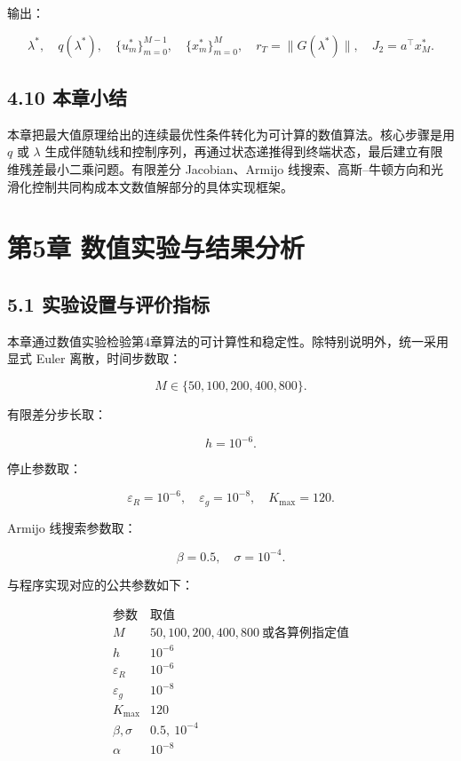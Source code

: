 \documentclass[UTF8,a4paper,zihao=-4]{ctexart}
\begin{document}
输出：

\[
\lambda^*,\quad q(\lambda^*),\quad \{u_m^*\}_{m=0}^{M-1},\quad
\{x_m^*\}_{m=0}^{M},\quad r_T=\|G(\lambda^*)\|,\quad J_2=a^\top x_M^*.
\]

\subsection{4.10 本章小结}

本章把最大值原理给出的连续最优性条件转化为可计算的数值算法。核心步骤是用 $q$ 或 $\lambda$ 生成伴随轨线和控制序列，再通过状态递推得到终端状态，最后建立有限维残差最小二乘问题。有限差分 Jacobian、Armijo 线搜索、高斯--牛顿方向和光滑化控制共同构成本文数值解部分的具体实现框架。

\section{第5章 数值实验与结果分析}

\subsection{5.1 实验设置与评价指标}

本章通过数值实验检验第4章算法的可计算性和稳定性\cite[第180--190页]{kiselev2007}\cite[第10--31页]{avvakumov1995}。除特别说明外，统一采用显式 Euler 离散，时间步数取：

\[
M\in\{50,100,200,400,800\}.
\]

有限差分步长取：

\[
h=10^{-6}.
\]

停止参数取：

\[
\varepsilon_R=10^{-6},\quad \varepsilon_g=10^{-8},\quad K_{\max}=120.
\]

Armijo 线搜索参数取：

\[
\beta=0.5,\quad \sigma=10^{-4}.
\]

与程序实现对应的公共参数如下：

\[
\begin{array}{c|c}
\text{参数} & \text{取值}\\
\hline
M & 50,100,200,400,800\ \text{或各算例指定值}\\
h & 10^{-6}\\
\varepsilon_R & 10^{-6}\\
\varepsilon_g & 10^{-8}\\
K_{\max} & 120\\
\beta,\sigma & 0.5,\ 10^{-4}\\
\alpha & 10^{-8}
\end{array}
\]
\end{document}
